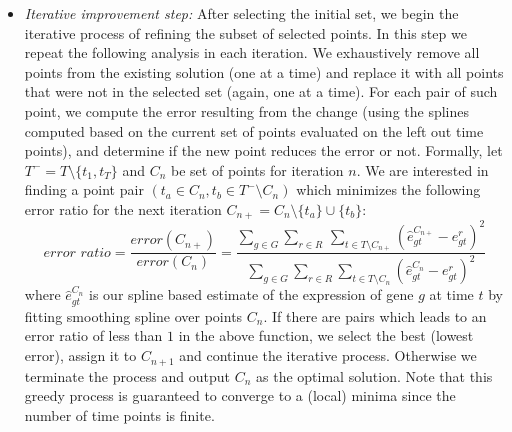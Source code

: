 \documentclass[10pt]{article}
\begin{document}
\begin{itemize}
\item {\em Iterative improvement step:} After selecting the initial set, we begin the iterative process of refining the subset of selected points.
In this step we repeat the following analysis in each iteration. We
exhaustively remove all points from the existing solution (one at a
time) and replace it with all points that were not in the selected
set (again, one at a time). For each pair of such point, we compute
the error resulting from the change (using the splines computed
based on the current set of points evaluated on the left out time
points), and determine if the new point reduces the error or not.
Formally, let $T^{-} = T \setminus \{t_{1}, t_{T}\}$ and $C_n$ be set of points for iteration $n$. We are
interested in finding a point pair $(t_{a} \in C_n, t_{b} \in T^{-}
\setminus C_n)$ which minimizes the following error ratio for the next iteration $C_{n+} =
C_n \setminus \{t_{a}\} \cup \{t_{b}\}$:
%
\begin{equation}
\textit{error ratio} = \frac{error(C_{n+})}{error(C_{n})} = \frac{\sum_{g \in G} \sum_{r \in R}\, \sum_{t \in
    T \setminus C_{n+}} (\hat{e}_{gt}^{C_{n+}} - e_{gt}^{r})^{2}}{\sum_{g \in G}
  \sum_{r \in R} \sum_{t \in
    T \setminus C_{n}} (\hat{e}_{gt}^{C_{n}} - e_{gt}^{r})^{2}}
\end{equation}
%
where $\hat{e}_{gt}^{C_{n}}$ is our spline based estimate of the expression
of gene $g$ at time $t$ by fitting smoothing spline over points
$C_{n}$. If there are pairs which leads to an error ratio
of less than $1$ in the above function, we select the best (lowest
error), assign it to $C_{n+1}$ and continue the iterative process. Otherwise we terminate
the process and output $C_n$ as the optimal solution. Note that this
greedy process is guaranteed to converge to a (local) minima since
the number of time points is finite.


\end{itemize}
\end{document}
